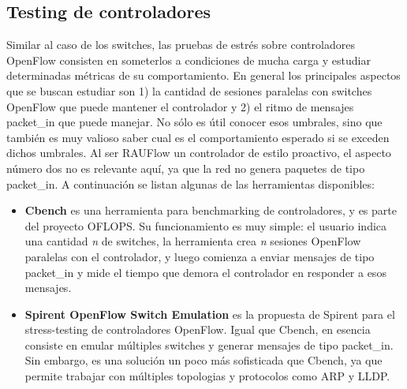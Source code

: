 \subsection{Testing de controladores}
Similar al caso de los switches, las pruebas de estrés sobre controladores OpenFlow consisten en someterlos a condiciones de mucha carga y estudiar determinadas métricas de su comportamiento. En general los principales aspectos que se buscan estudiar son 1) la cantidad de sesiones paralelas con switches OpenFlow que puede mantener el controlador y 2) el ritmo de mensajes packet\_in que puede manejar. No sólo es útil conocer esos umbrales, sino que también es muy valioso saber cual es el comportamiento esperado si se exceden dichos umbrales. Al ser RAUFlow un controlador de estilo proactivo, el aspecto número dos no es relevante aquí, ya que la red no genera paquetes de tipo packet\_in. A continuación se listan algunas de las herramientas disponibles:
\begin{itemize}
	\item \textbf{Cbench} \cite{cbench} es una herramienta para benchmarking de controladores, y es parte del proyecto OFLOPS. Su funcionamiento es muy simple: el usuario indica una cantidad \textit{n} de switches, la herramienta crea \textit{n} sesiones OpenFlow paralelas con el controlador, y luego comienza a enviar mensajes de tipo packet\_in y mide el tiempo que demora el controlador en responder a esos mensajes.
	\item \textbf{Spirent OpenFlow Switch Emulation} \cite{spirent-switch-emulation} es la propuesta de Spirent para el stress-testing de controladores OpenFlow. Igual que Cbench, en esencia consiste en emular múltiples switches y generar mensajes de tipo packet\_in. Sin embargo, es una solución un poco más sofisticada que Cbench, ya que permite trabajar con múltiples topologias y protocolos como ARP y LLDP.
\end{itemize}


